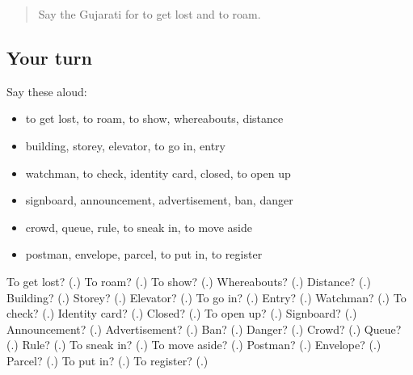 \label{lesson:GU-R200-review-195-200}



\begin{quote}
Say the Gujarati for to get lost and to roam.
\end{quote}

\subsection*{Your turn}
Say these aloud:

\begin{itemize}
\raggedright
  \item to get lost, to roam, to show, whereabouts, distance
  \item building, storey, elevator, to go in, entry
  \item watchman, to check, identity card, closed, to open up
  \item signboard, announcement, advertisement, ban, danger
  \item crowd, queue, rule, to sneak in, to move aside
  \item postman, envelope, parcel, to put in, to register
\end{itemize}

\begin{tcolorbox}[breakable,colback=teal!4,colframe=teal!35!black,title={Before you move on}]
To get lost? (\textbf{}.) To roam? (\textbf{}.) To show? (\textbf{}.) Whereabouts? (\textbf{}.) Distance? (\textbf{}.) Building? (\textbf{}.) Storey? (\textbf{}.) Elevator? (\textbf{}.) To go in? (\textbf{}.) Entry? (\textbf{}.) Watchman? (\textbf{}.) To check? (\textbf{}.) Identity card? (\textbf{}.) Closed? (\textbf{}.) To open up? (\textbf{}.) Signboard? (\textbf{}.) Announcement? (\textbf{}.) Advertisement? (\textbf{}.) Ban? (\textbf{}.) Danger? (\textbf{}.) Crowd? (\textbf{}.) Queue? (\textbf{}.) Rule? (\textbf{}.) To sneak in? (\textbf{}.) To move aside? (\textbf{}.) Postman? (\textbf{}.) Envelope? (\textbf{}.) Parcel? (\textbf{}.) To put in? (\textbf{}.) To register? (\textbf{}.)
\end{tcolorbox}
